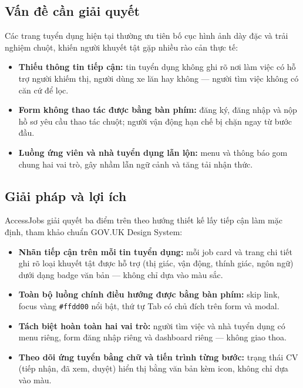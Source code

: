 \documentclass[12pt,a4paper]{article}
\newcommand{\projectname}{AccessJobs}
\begin{document}
\subsection{Vấn đề cần giải quyết}

Các trang tuyển dụng hiện tại thường ưu tiên bố cục hình ảnh dày đặc và trải nghiệm chuột,
khiến người khuyết tật gặp nhiều rào cản thực tế:

\begin{itemize}
  \item \textbf{Thiếu thông tin tiếp cận:} tin tuyển dụng không ghi rõ nơi làm việc có hỗ trợ
  người khiếm thị, người dùng xe lăn hay không — người tìm việc không có căn cứ để lọc.
  \item \textbf{Form không thao tác được bằng bàn phím:} đăng ký, đăng nhập và nộp hồ sơ
  yêu cầu thao tác chuột; người vận động hạn chế bị chặn ngay từ bước đầu.
  \item \textbf{Luồng ứng viên và nhà tuyển dụng lẫn lộn:} menu và thông báo gom chung
  hai vai trò, gây nhầm lẫn ngữ cảnh và tăng tải nhận thức.
\end{itemize}

\subsection{Giải pháp và lợi ích}

\projectname{} giải quyết ba điểm trên theo hướng thiết kế lấy tiếp cận làm mặc định,
tham khảo chuẩn GOV.UK Design System:

\begin{itemize}
  \item \textbf{Nhãn tiếp cận trên mỗi tin tuyển dụng:} mỗi job card và trang chi tiết ghi
  rõ loại khuyết tật được hỗ trợ (thị giác, vận động, thính giác, ngôn ngữ) dưới dạng
  badge văn bản — không chỉ dựa vào màu sắc.
  \item \textbf{Toàn bộ luồng chính điều hướng được bằng bàn phím:} skip link, focus vàng
  \texttt{\#ffdd00} nổi bật, thứ tự Tab có chủ đích trên form và modal.
  \item \textbf{Tách biệt hoàn toàn hai vai trò:} người tìm việc và nhà tuyển dụng có menu riêng, form đăng nhập
  riêng và dashboard riêng — không giao thoa.
  \item \textbf{Theo dõi ứng tuyển bằng chữ và tiến trình từng bước:} trạng thái CV
  (tiếp nhận, đã xem, duyệt) hiển thị bằng văn bản kèm icon, không chỉ dựa vào màu.
\end{itemize}
\end{document}
